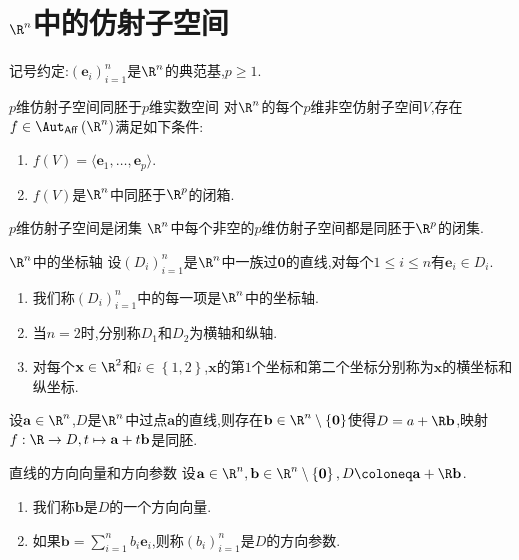 \section{\texorpdfstring{$\R^{n}$}{Rn}中的仿射子空间}

记号约定:$\left(\mathbf{e}_{i}\right)_{i=1}^{n}$是$\R^{n}$的典范基,$p\geq 1$.

\begin{proposition}{$p$维仿射子空间同胚于$p$维实数空间}{}
	对$\R^{n}$的每个$p$维非空仿射子空间$V$,存在$f\in\Aut_{\mathsf{Aff}}\left(\R^{n}\right)$满足如下条件:
	\begin{enumerate}
		\item $f\left(V\right)=\langle\mathbf{e}_{1},\ldots,\mathbf{e}_{p}\rangle$.
		\item $f\left(V\right)$是$\R^{n}$中同胚于$\R^{p}$的闭箱.
	\end{enumerate}
\end{proposition}

\begin{proposition}{$p$维仿射子空间是闭集}{}
	$\R^{n}$中每个非空的$p$维仿射子空间都是同胚于$\R^{p}$的闭集.
\end{proposition}

\begin{definition}{$\R^{n}$中的坐标轴}{}
	设$\left(D_{i}\right)_{i=1}^{n}$是$\R^{n}$中一族过$\mathbf{0}$的直线,对每个$1\leq i\leq n$有$\mathbf{e}_{i}\in D_{i}$.
	\begin{enumerate}
		\item 我们称$\left(D_{i}\right)_{i=1}^{n}$中的每一项是$\R^{n}$中的坐标轴.
		\item 当$n=2$时,分别称$D_{1}$和$D_{2}$为横轴和纵轴.
		\item 对每个$\mathbf{x}\in\R^{2}$和$i\in\left\{1,2\right\}$,$\mathbf{x}$的第$1$个坐标和第二个坐标分别称为$\mathbf{x}$的横坐标和纵坐标.
	\end{enumerate}
\end{definition}

\begin{proposition}{}{}
	设$\mathbf{a}\in\R^{n}$,$D$是$\R^{n}$中过点$\mathbf{a}$的直线,则存在$\mathbf{b}\in\R^{n}\setminus\left\{\mathbf{0}\right\}$使得$D=a+\R\mathbf{b}$,映射$f:\R\to D,t\mapsto\mathbf{a}+t\mathbf{b}$是同胚.
\end{proposition}

\begin{definition}{直线的方向向量和方向参数}{}
	设$\mathbf{a}\in\R^{n},\mathbf{b}\in\R^{n}\setminus\left\{\mathbf{0}\right\},D\coloneq\mathbf{a}+\R\mathbf{b}$.
	\begin{enumerate}
		\item 我们称$\mathbf{b}$是$D$的一个方向向量.
		\item 如果$\mathbf{b}=\sum\limits_{i=1}^{n}b_{i}\mathbf{e}_{i}$,则称$\left(b_{i}\right)_{i=1}^{n}$是$D$的方向参数.
	\end{enumerate}
\end{definition}

